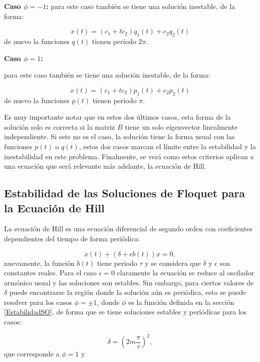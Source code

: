 \documentclass[a4paper,10pt]{report}
\begin{document}
\textbf{Caso $\phi = -1$:} para este caso también se tiene una solución inestable, de la forma:

\begin{equation}
x(t) = (c_1 + tc_2)q_1(t) + c_2q_2(t)
\end{equation} de nuevo la funciones $q(t)$ tienen periodo $2\pi$.

\textbf{Caso $\phi = 1$:}

para este caso también se tiene una solución inestable, de la forma:

\begin{equation}
x(t) = (c_1 + tc_2)p_1(t) + c_2p_2(t)
\end{equation} de nuevo la funciones $p(t)$ tienen periodo $\pi$.

Es muy importante notar que en estos dos últimos casos, esta forma de la solución solo es correcta si la matriz $B$ tiene un solo eigenvector linealmente independiente. Si este no es el caso, la solución tiene la forma usual con las funciones $p(t)$ o $q(t)$, estos dos casos marcan el límite entre la estabilidad y la inestabilidad en este problema. Finalmente, se verá como estos criterios aplican a una ecuación que será relevante más adelante, la ecuación de Hill.

\subsection{Estabilidad de las Soluciones de Floquet para la Ecuación de Hill}

La ecuación de Hill es una ecuación diferencial de segundo orden con coeficientes dependientes del tiempo de forma periódica\cite{WardFT}:

\begin{equation}
\ddot{x}(t) + (\delta + \epsilon b(t))x = 0,
\end{equation} nuevamente, la función $b(t)$ tiene periodo $\tau$ y se considera que $\delta$ y $\epsilon$ son constantes reales. Para el caso $\epsilon = 0$ claramente la ecuación se reduce al oscilador armónico usual y las soluciones son estables. Sin embargo, para ciertos valores de $\delta$ puede encontrarse la región donde la solución aún es periódica, esto se puede resolver para los casos $\phi = \pm 1$, donde $\phi$ es la función definida en la sección \ref{EstabilidadSO}, de forma que se tiene soluciones estables y periódicas para los casos:

\begin{equation}
\delta = (2m\frac{\pi}{\tau})^2, 
\end{equation} que corresponde a $\phi=1$ y
\end{document}
